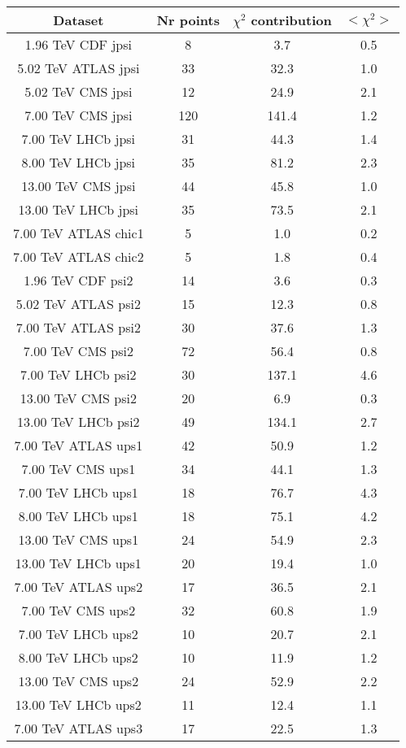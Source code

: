 \begin{table}[h!]
\centering
\begin{tabular}{c|c|c|c}
Dataset & Nr points & $\chi^2$ contribution & $<\chi^2>$ \\
\hline
1.96 TeV CDF jpsi & 8 & 3.7 & 0.5 \\
5.02 TeV ATLAS jpsi & 33 & 32.3 & 1.0 \\
5.02 TeV CMS jpsi & 12 & 24.9 & 2.1 \\
7.00 TeV CMS jpsi & 120 & 141.4 & 1.2 \\
7.00 TeV LHCb jpsi & 31 & 44.3 & 1.4 \\
8.00 TeV LHCb jpsi & 35 & 81.2 & 2.3 \\
13.00 TeV CMS jpsi & 44 & 45.8 & 1.0 \\
13.00 TeV LHCb jpsi & 35 & 73.5 & 2.1 \\
7.00 TeV ATLAS chic1 & 5 & 1.0 & 0.2 \\
7.00 TeV ATLAS chic2 & 5 & 1.8 & 0.4 \\
1.96 TeV CDF psi2 & 14 & 3.6 & 0.3 \\
5.02 TeV ATLAS psi2 & 15 & 12.3 & 0.8 \\
7.00 TeV ATLAS psi2 & 30 & 37.6 & 1.3 \\
7.00 TeV CMS psi2 & 72 & 56.4 & 0.8 \\
7.00 TeV LHCb psi2 & 30 & 137.1 & 4.6 \\
13.00 TeV CMS psi2 & 20 & 6.9 & 0.3 \\
13.00 TeV LHCb psi2 & 49 & 134.1 & 2.7 \\
7.00 TeV ATLAS ups1 & 42 & 50.9 & 1.2 \\
7.00 TeV CMS ups1 & 34 & 44.1 & 1.3 \\
7.00 TeV LHCb ups1 & 18 & 76.7 & 4.3 \\
8.00 TeV LHCb ups1 & 18 & 75.1 & 4.2 \\
13.00 TeV CMS ups1 & 24 & 54.9 & 2.3 \\
13.00 TeV LHCb ups1 & 20 & 19.4 & 1.0 \\
7.00 TeV ATLAS ups2 & 17 & 36.5 & 2.1 \\
7.00 TeV CMS ups2 & 32 & 60.8 & 1.9 \\
7.00 TeV LHCb ups2 & 10 & 20.7 & 2.1 \\
8.00 TeV LHCb ups2 & 10 & 11.9 & 1.2 \\
13.00 TeV CMS ups2 & 24 & 52.9 & 2.2 \\
13.00 TeV LHCb ups2 & 11 & 12.4 & 1.1 \\
7.00 TeV ATLAS ups3 & 17 & 22.5 & 1.3 \\

\end{tabular}
\end{table}
